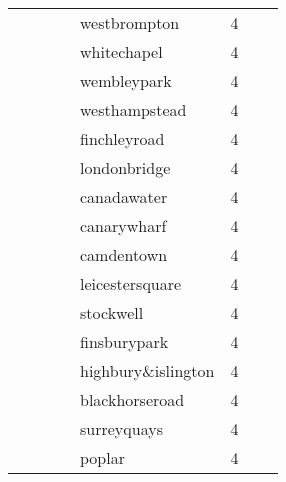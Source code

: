 \begin{adjustwidth}{-1.3in}{-1.3in}
\begin{center}
\begin{tabular}{lrlrlrlr}
                     &             &                     &         & westbrompton        &      4 &                     &        \\
                     &             &                     &         & whitechapel         &      4 &                     &        \\
                     &             &                     &         & wembleypark         &      4 &                     &        \\
                     &             &                     &         & westhampstead       &      4 &                     &        \\
                     &             &                     &         & finchleyroad        &      4 &                     &        \\
                     &             &                     &         & londonbridge        &      4 &                     &        \\
                     &             &                     &         & canadawater         &      4 &                     &        \\
                     &             &                     &         & canarywharf         &      4 &                     &        \\
                     &             &                     &         & camdentown          &      4 &                     &        \\
                     &             &                     &         & leicestersquare     &      4 &                     &        \\
                     &             &                     &         & stockwell           &      4 &                     &        \\
                     &             &                     &         & finsburypark        &      4 &                     &        \\
                     &             &                     &         & highbury\&islington  &      4 &                     &        \\
                     &             &                     &         & blackhorseroad      &      4 &                     &        \\
                     &             &                     &         & surreyquays         &      4 &                     &        \\
                     &             &                     &         & poplar              &      4 &                     &        \\
\hline
\end{tabular}
\end{center}\end{adjustwidth}
